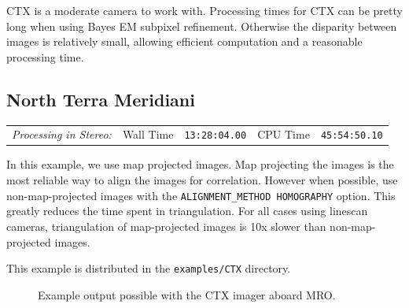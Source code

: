 \ac{CTX} is a moderate camera to work with. Processing times for
\ac{CTX} can be pretty long when using Bayes EM subpixel
refinement. Otherwise the disparity between images is relatively
small, allowing efficient computation and a reasonable processing time.

\subsection{North Terra Meridiani}

\begin{tabular}{l r c r c}
\textit{Processing in Stereo:} & Wall Time & \texttt{13:28:04.00} & CPU Time & \texttt{45:54:50.10} \\
\end{tabular}

In this example, we use map projected images. Map projecting the
images is the most reliable way to align the images for
correlation. However when possible, use non-map-projected images with
the \texttt{ALIGNMENT\_METHOD HOMOGRAPHY} option. This greatly reduces
the time spent in triangulation. For all cases using linescan cameras,
triangulation of map-projected images is 10x slower than
non-map-projected images.

This example is distributed in the \texttt{examples/CTX} directory.

\begin{figure}[b!]
\centering
  \hfil
\caption{Example output possible with the CTX imager aboard MRO.}
\label{fig:ctx_example}
\end{figure}

